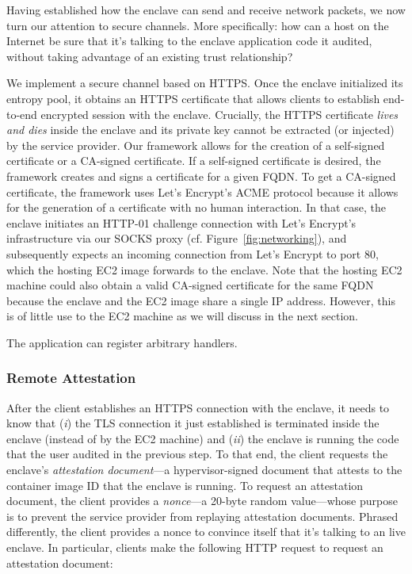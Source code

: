 Having established how the enclave can send and receive network packets, we now
turn our attention to secure channels.  More specifically: how can a host on
the Internet be sure that it's talking to the enclave application code it
audited, without taking advantage of an existing trust relationship?

We implement a secure channel based on HTTPS.  Once the enclave initialized its
entropy pool, it obtains an HTTPS certificate that allows clients to establish
end-to-end encrypted session with the enclave.  Crucially, the HTTPS
certificate \emph{lives and dies} inside the enclave and its private key cannot
be extracted (or injected) by the service provider.  Our framework allows for
the creation of a self-signed certificate or a CA-signed certificate.  If a
self-signed certificate is desired, the framework creates and signs a
certificate for a given FQDN.  To get a CA-signed certificate, the framework
uses Let's Encrypt's ACME protocol because it allows for the generation of a
certificate with no human interaction.  In that case, the enclave initiates an
HTTP-01 challenge connection with Let's Encrypt's infrastructure via our SOCKS
proxy (cf. Figure~\ref{fig:networking}), and subsequently expects an incoming
connection from Let's Encrypt to port 80, which the hosting EC2 image forwards
to the enclave.  Note that the hosting EC2 machine could also obtain a valid
CA-signed certificate for the same FQDN because the enclave and the EC2 image
share a single IP address.  However, this is of little use to the EC2 machine
as we will discuss in the next section.

The application can register arbitrary handlers.


\subsubsection{Remote Attestation}
\label{sec:attestation}

After the client establishes an HTTPS connection with the enclave, it needs to
know that (\emph{i}) the TLS connection it just established is terminated
inside the enclave (instead of by the EC2 machine) and (\emph{ii}) the enclave
is running the code that the user audited in the previous step.  To that end,
the client requests the enclave's \emph{attestation document}---a
hypervisor-signed document that attests to the container image ID that the
enclave is running.  To request an attestation document, the client provides a
\emph{nonce}---a 20-byte random value---whose purpose is to prevent the service
provider from replaying attestation documents.  Phrased differently, the client
provides a nonce to convince itself that it's talking to an live enclave.  In
particular, clients make the following HTTP request to request an attestation
document:

